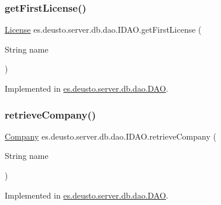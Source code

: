 \subsubsection{\texorpdfstring{get\+First\+License()}{getFirstLicense()}}
{\footnotesize\ttfamily \hyperlink{classes_1_1deusto_1_1server_1_1db_1_1data_1_1_license}{License} es.\+deusto.\+server.\+db.\+dao.\+I\+D\+A\+O.\+get\+First\+License (\begin{DoxyParamCaption}\item[{String}]{name }\end{DoxyParamCaption})}



Implemented in \hyperlink{classes_1_1deusto_1_1server_1_1db_1_1dao_1_1_d_a_o_a4a5a54059bac00ea6f3b6d21f2a31a02}{es.\+deusto.\+server.\+db.\+dao.\+D\+AO}.

\mbox{\label{interfacees_1_1deusto_1_1server_1_1db_1_1dao_1_1_i_d_a_o_ad6fd7873e2191e887184e2261e34e3e5}} 
\subsubsection{\texorpdfstring{retrieve\+Company()}{retrieveCompany()}}
{\footnotesize\ttfamily \hyperlink{classes_1_1deusto_1_1server_1_1db_1_1data_1_1_company}{Company} es.\+deusto.\+server.\+db.\+dao.\+I\+D\+A\+O.\+retrieve\+Company (\begin{DoxyParamCaption}\item[{String}]{name }\end{DoxyParamCaption})}



Implemented in \hyperlink{classes_1_1deusto_1_1server_1_1db_1_1dao_1_1_d_a_o_aabd374b169473cfd6e1bdc4efc89b177}{es.\+deusto.\+server.\+db.\+dao.\+D\+AO}.

\mbox{\label{interfacees_1_1deusto_1_1server_1_1db_1_1dao_1_1_i_d_a_o_a5bab06408d3191e9bfd553384e65e7a4}} 
